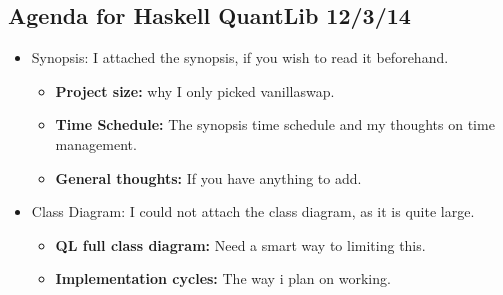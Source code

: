 \documentclass{article}
\begin{document}
\begin{center}
\section*{Agenda for Haskell QuantLib 12/3/14}
\end{center}
\begin{itemize}
\item{Synopsis:} I attached the synopsis, if you wish to read it beforehand.
    \begin{itemize}
        \item{\textbf{Project size:}} why I only picked vanillaswap.
        \item{\textbf{Time Schedule:}} The synopsis time schedule and my thoughts on time management.
        \item{\textbf{General thoughts:}} If you have anything to add.
    \end{itemize}
\item{Class Diagram:} I could not attach the class diagram, as it is quite large.
    \begin{itemize}
        \item{\textbf{QL full class diagram:}} Need a smart way to limiting this. 
        \item{\textbf{Implementation cycles:}} The way i plan on working. 
    \end{itemize}
\end{itemize}


% 
\end{document}
